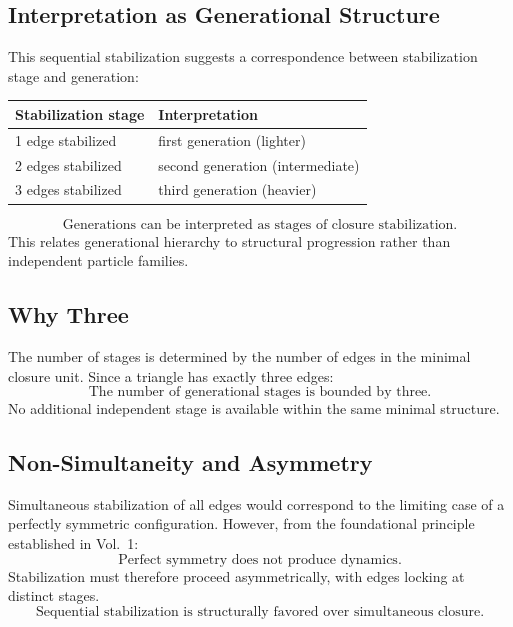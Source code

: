 \subsection{Interpretation as Generational Structure}

This sequential stabilization suggests a correspondence
between stabilization stage and generation:
\begin{center}
\begin{tabular}{ll}
\toprule
Stabilization stage & Interpretation \\
\midrule
1 edge stabilized & first generation (lighter) \\
2 edges stabilized & second generation (intermediate) \\
3 edges stabilized & third generation (heavier) \\
\bottomrule
\end{tabular}
\end{center}
\begin{equation}
  \boxed{
    \text{Generations can be interpreted as stages of closure stabilization.}
  }
\end{equation}
This relates generational hierarchy to structural progression
rather than independent particle families.

\subsection{Why Three}

The number of stages is determined by the number of edges
in the minimal closure unit.
Since a triangle has exactly three edges:
\begin{equation}
  \boxed{\text{The number of generational stages is bounded by three.}}
\end{equation}
No additional independent stage is available within the same minimal structure.

\subsection{Non-Simultaneity and Asymmetry}

Simultaneous stabilization of all edges would correspond to
the limiting case of a perfectly symmetric configuration.
However, from the foundational principle established in Vol.~1:
\begin{equation}
  \boxed{\text{Perfect symmetry does not produce dynamics.}}
\end{equation}
Stabilization must therefore proceed asymmetrically,
with edges locking at distinct stages.
\begin{equation}
  \boxed{
    \text{Sequential stabilization is structurally favored over
    simultaneous closure.}
  }
\end{equation}

